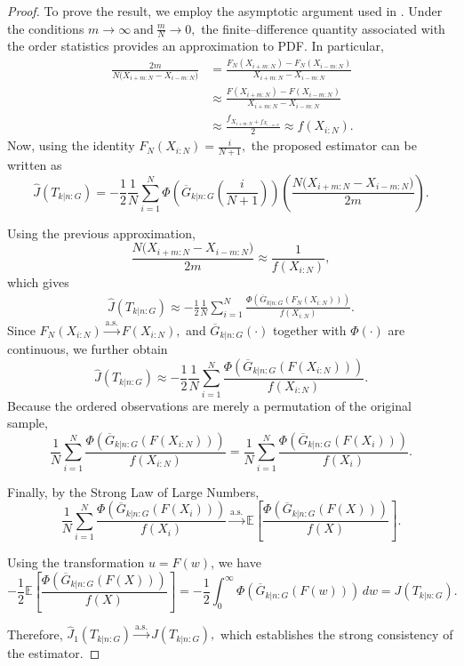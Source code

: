 \documentclass[12pt,a4paper]{article}
\numberwithin{equation}{section}
\begin{document}
\begin{proof}
To prove the result, we employ the asymptotic argument used in \cite{nou2011}. Under the conditions $m\to\infty
~\text{and}~
\frac{m}{N}\to0,$
the finite--difference quantity associated with the order statistics provides an approximation to PDF. In particular,
\begin{align*}\
    \frac{2m}
{N\bigl(X_{i+m:N}-X_{i-m:N}\bigr)}
&=
\frac{
F_N(X_{i+m:N})-F_N(X_{i-m:N})
}
{
X_{i+m:N}-X_{i-m:N}
}\nonumber\\
&\approx
\frac{
F(X_{i+m:N})-F(X_{i-m:N})
}
{
X_{i+m:N}-X_{i-m:N}
}\\
&\approx\frac{f_{X_{i+m:N}+f_{X_{i-m:N}}}}{2}\approx f(X_{i:N}).
\end{align*} 
Now, using the identity $F_N(X_{i:N})=\frac{i}{N+1},$
the proposed estimator can be written as
$$
\widehat{ J}(T_{k|n:G})
=-\frac12\frac1N
\sum_{i=1}^N
\Phi\!\left(
\overline G_{k|n:G}\!\left(\frac{i}{N+1}\right)
\right)
\left(
\frac{
N\bigl(X_{i+m:N}-X_{i-m:N}\bigr)
}
{2m}
\right).
$$

Using the previous approximation,
$$
\frac{
N\bigl(X_{i+m:N}-X_{i-m:N}\bigr)
}
{2m}
\approx
\frac1{f(X_{i:N})},
$$
which gives
\begin{align*}
    \widehat{J}(T_{k|n:G})
\approx-\frac12
\frac1N
\sum_{i=1}^N
\frac{
\Phi\!\left(
\overline G_{k|n:G}\!\left(
F_N(X_{i:N})
\right)
\right)
}
{f(X_{i:N})}.
\end{align*}
Since $F_N(X_{i:N})
\xrightarrow{\text{a.s.}}
F(X_{i:N}),$
and $\overline G_{k|n:G}(\cdot)$ together with $\Phi(\cdot)$ are continuous, we further obtain
$$
\widehat{J}(T_{k|n:G})
\approx-\frac12
\frac1N
\sum_{i=1}^N
\frac{
\Phi\!\left(
\overline G_{k|n:G}\!\left(
F(X_{i:N})
\right)
\right)
}
{f(X_{i:N})}.
$$
Because the ordered observations are merely a permutation of the original sample,
$$
\frac1N
\sum_{i=1}^N
\frac{
\Phi\!\left(
\overline G_{k|n:G}\!\left(
F(X_{i:N})
\right)
\right)
}
{f(X_{i:N})}
=
\frac1N
\sum_{i=1}^N
\frac{
\Phi\!\left(
\overline G_{k|n:G}\!\left(
F(X_i)
\right)
\right)
}
{f(X_i)}.
$$

Finally, by the Strong Law of Large Numbers,
$$
\frac1N
\sum_{i=1}^N
\frac{
\Phi\!\left(
\overline G_{k|n:G}\!\left(
F(X_i)
\right)
\right)
}
{f(X_i)}
\xrightarrow{\text{a.s.}}
\mathbb E\!\left[
\frac{
\Phi\!\left(
\overline G_{k|n:G}(F(X))
\right)
}
{f(X)}
\right].
$$

Using the transformation $u=F(w)$, we have
$$
-\frac{1}{2}\mathbb E\!\left[
\frac{
\Phi\!\left(
\overline G_{k|n:G}(F(X))
\right)
}
{f(X)}
\right]
=
-\frac12\int_0^\infty
\Phi\!\left(
\overline G_{k|n:G}(F(w))
\right)\,dw
=
J(T_{k|n:G}).
$$

Therefore, $\widehat{J}_1(T_{k|n:G})
\xrightarrow{\text{a.s.}}
J(T_{k|n:G}),$
which establishes the strong consistency of the estimator.
\end{proof}
\end{document}
